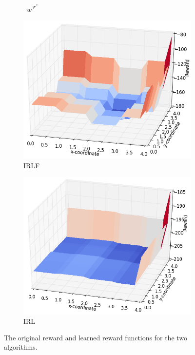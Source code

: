 \documentclass{aamas2016}
\begin{document}
\begin{figure}[t]
\begin{subfigure}[b]{0.51\columnwidth}
    
    \caption{\ $w^{\mathcal{F}^*}$}
    \label{fig:rf_plot_bad}
  \end{subfigure}  
  \label{fig:contrastive}
  \begin{subfigure}[b]{0.51\columnwidth}

    \includegraphics[clip=true,width=\textwidth]{images/RF_IRLF.png}
    \caption{IRLF}
    \label{fig:rf_plot_irlf}
  \end{subfigure}
  \hfill
  \begin{subfigure}[b]{0.51\columnwidth}
    \includegraphics[clip=true,width=\textwidth]{images/RF_IRL.png}
    \caption{IRL}
    \label{fig:rf_plot_irl}
  \end{subfigure}  
  \caption{The original reward and learned reward functions for the two algorithms.\ }
  \label{fig:rf_plot}
\end{figure}
\end{document}
